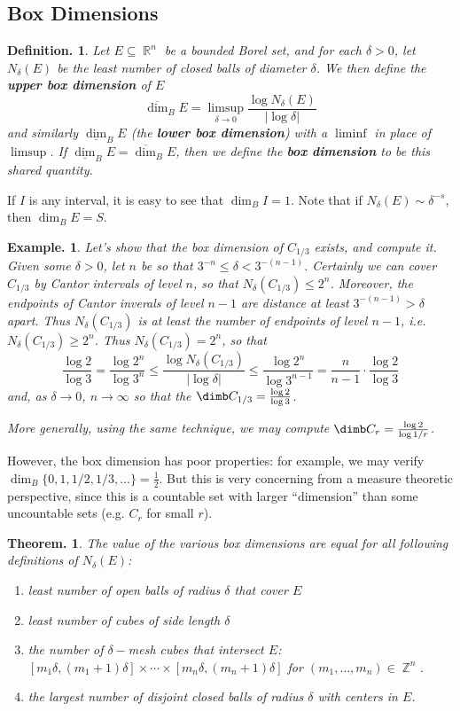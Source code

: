 \documentclass[11pt, a4paper]{memoir}
\DeclareMathOperator{\Z}{{\mathbb{Z}}}
\DeclareMathOperator{\R}{{\mathbb{R}}}
\theoremstyle{change}
\newtheorem{theorem}{Theorem.}[section]
\theoremstyle{plain}
\theoremstyle{nonumberplain}
\newtheorem{definition}{Definition.}
\newtheorem{example}{Example.}
\newcommand{\defn}[1]{{\boldmath\bfseries #1}}
\newcommand{\bdim}{\ensuremath{\dim_B}}
\newcommand{\ubdim}{\ensuremath{\overline{\dim}_B}}
\newcommand{\lbdim}{\ensuremath{\underline{\dim}_B}}
\numberwithin{equation}{section}
\begin{document}
\subsection{Box Dimensions}
\begin{definition}
    Let $E\subseteq\R^n$ be a bounded Borel set, and for each $\delta>0$, let $N_\delta(E)$ be the least number of closed balls of diameter $\delta$.
    We then define the \defn{upper box dimension} of $E$
    \begin{equation*}
        \ubdim E=\limsup_{\delta\to 0}\frac{\log N_\delta(E)}{|\log\delta|}
    \end{equation*}
    and similarly $\lbdim E$ (the \defn{lower box dimension}) with a $\liminf$ in place of $\limsup$.
    If $\lbdim E=\ubdim E$, then we define the \defn{box dimension} to be this shared quantity.
\end{definition}
If $I$ is any interval, it is easy to see that $\bdim I=1$.
Note that if $N_\delta(E)\sim\delta^{-s}$, then $\bdim E=S$.
\begin{example}
    Let's show that the box dimension of $C_{1/3}$ exists, and compute it.
    Given some $\delta>0$, let $n$ be so that $3^{-n}\leq\delta<3^{-(n-1)}$.
    Certainly we can cover $C_{1/3}$ by Cantor intervals of level $n$, so that $N_\delta(C_{1/3})\leq 2^n$.
    Moreover, the endpoints of Cantor inverals of level $n-1$ are distance at least $3^{-(n-1)}>\delta$ apart.
    Thus $N_\delta(C_{1/3})$ is at least the number of endpoints of level $n-1$, i.e. $N_\delta(C_{1/3})\geq 2^n$.
    Thus $N_\delta(C_{1/3})=2^n$, so that
    \begin{equation*}
        \frac{\log 2}{\log 3}=\frac{\log 2^n}{\log 3^n}\leq\frac{\log N_\delta(C_{1/3})}{|\log\delta|}\leq\frac{\log 2^n}{\log 3^{n-1}}=\frac{n}{n-1}\cdot\frac{\log 2}{\log 3}
    \end{equation*}
    and, as $\delta\to 0$, $n\to\infty$ so that the $\dimb C_{1/3}=\frac{\log 2}{\log 3}$.

    More generally, using the same technique, we may compute $\dimb C_r=\frac{\log 2}{\log 1/r}$.
\end{example}
However, the box dimension has poor properties: for example, we may verify $\bdim\{0,1,1/2,1/3,\ldots\}=\frac{1}{2}$.
But this is very concerning from a measure theoretic perspective, since this is a countable set with larger ``dimension'' than some uncountable sets (e.g. $C_r$ for small $r$).
\begin{theorem}
    The value of the various box dimensions are equal for all following definitions of $N_\delta(E)$:
    \begin{enumerate}[nl]
        \item least number of open balls of radius $\delta$ that cover $E$
        \item least number of cubes of side length $\delta$
        \item the number of $\delta-$mesh cubes that intersect $E$: $[m_1\delta,(m_1+1)\delta]\times\cdots\times[m_n\delta,(m_n+1)\delta]$ for $(m_1,\ldots,m_n)\in\Z^n$.
        \item the largest number of disjoint closed balls of radius $\delta$ with centers in $E$.
    \end{enumerate}
\end{theorem}
\end{document}
